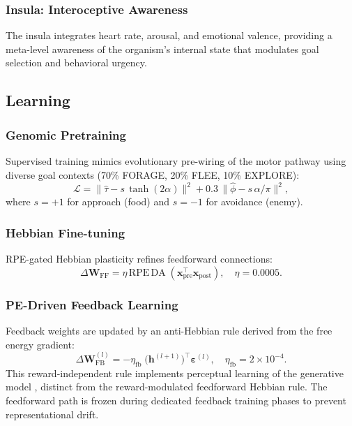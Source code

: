 \documentclass[12pt]{article}
\begin{document}
\subsubsection{Insula: Interoceptive Awareness}

The insula integrates heart rate, arousal, and emotional valence,
providing a meta-level awareness of the organism's internal state
that modulates goal selection and behavioral urgency.

\subsection{Learning}\label{sec:learning}

\subsubsection{Genomic Pretraining}

Supervised training mimics evolutionary pre-wiring of the motor
pathway using diverse goal contexts (70\% FORAGE, 20\% FLEE,
10\% EXPLORE):
\begin{equation}\label{eq:genomic}
  \mathcal{L} = \|\hat{\tau} - s\,\tanh(2\alpha)\|^2
    + 0.3\,\|\hat{\phi} - s\,\alpha/\pi\|^2,
\end{equation}
where $s = +1$ for approach (food) and $s = -1$ for avoidance (enemy).

\subsubsection{Hebbian Fine-tuning}

RPE-gated Hebbian plasticity refines feedforward connections:
\begin{equation}\label{eq:hebbian}
  \Delta\mathbf{W}_\text{FF} = \eta\,\text{RPE}\,\text{DA}\;
    (\mathbf{x}_\text{pre}^\top \mathbf{x}_\text{post}),
  \quad \eta = 0.0005.
\end{equation}

\subsubsection{PE-Driven Feedback Learning}

Feedback weights are updated by an anti-Hebbian rule derived from
the free energy gradient:
\begin{equation}\label{eq:feedback}
  \Delta\mathbf{W}_\text{FB}^{(l)} =
    -\eta_\text{fb}\;\bigl(\mathbf{h}^{(l+1)}\bigr)^\top
    \boldsymbol{\varepsilon}^{(l)},
  \quad \eta_\text{fb} = 2 \times 10^{-4}.
\end{equation}
This reward-independent rule implements perceptual learning of the
generative model \citep{rao1999,bogacz2017}, distinct from the
reward-modulated feedforward Hebbian rule.
The feedforward path is frozen during dedicated feedback training
phases to prevent representational drift.
\end{document}
